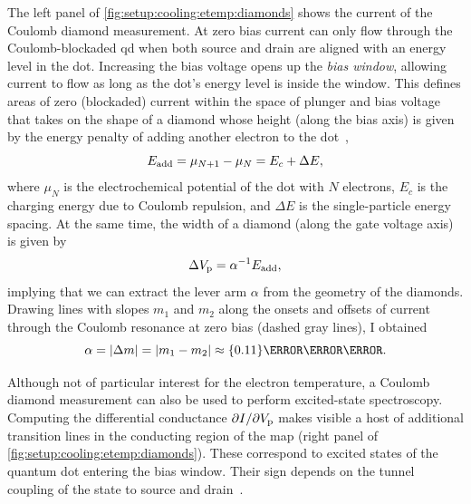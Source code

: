 The left panel of \cref{fig:setup:cooling:etemp:diamonds} shows the current of the Coulomb diamond measurement.
At zero bias current can only flow through the Coulomb-blockaded \gls{qd} when both source and drain are aligned with an energy level in the dot.
Increasing the bias voltage opens up the \emph{bias window}, allowing current to flow as long as the dot's energy level is inside the window.
This defines areas of zero (blockaded) current within the space of plunger and bias voltage that takes on the shape of a diamond whose height (along the bias axis) is given by the energy penalty of adding another electron to the dot~\cite{Ihn2009},
\begin{equation}
    E_{\mathrm{add}} = \mu_{N+1} - \mu_N = E_c + \Delta E,
\end{equation}
where $\mu_N$ is the electrochemical potential of the dot with $N$ electrons, $E_c$ is the charging energy due to Coulomb repulsion, and $\Delta E$ is the single-particle energy spacing.
At the same time, the width of a diamond (along the gate voltage axis) is given by
\begin{equation}
    \Delta V_{\mathrm{p}} = \alpha^{-1} E_{\mathrm{add}},
\end{equation}
implying that we can extract the lever arm $\alpha$ from the geometry of the diamonds.
Drawing lines with slopes $m_1$ and $m_2$ along the onsets and offsets of current through the Coulomb resonance at zero bias (dashed gray lines), I obtained
\begin{equation}
    \alpha = \abs{\Delta m} = \abs{m_1 - m_2} \approx\qty{0.11}{\eV\per\volt}.
\end{equation}

Although not of particular interest for the electron temperature, a Coulomb diamond measurement can also be used to perform excited-state spectroscopy.
Computing the differential conductance $\partial I/\partial V_{\mathrm{p}}$ makes visible a host of additional transition lines in the conducting region of the map (right panel of \cref{fig:setup:cooling:etemp:diamonds}).
These correspond to excited states of the quantum dot entering the bias window.
Their sign depends on the tunnel coupling of the state to source and drain~\cite{Ihn2009}.

